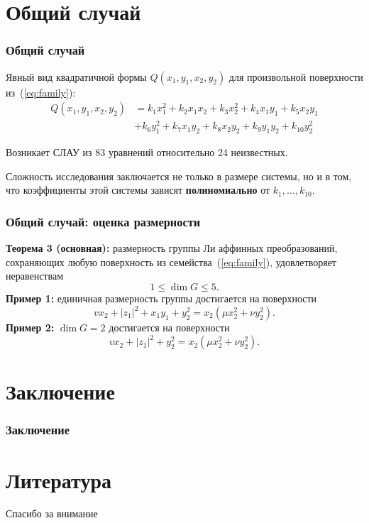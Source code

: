 \documentclass[russian,hyperref={unicode}]{beamer}
\begin{document}
\section{Общий случай}
\frame
{
	\frametitle{Общий случай}
	Явный вид квадратичной формы $Q(x_1, y_1, x_2, y_2)$ для произвольной поверхности из~(\ref{eq:family}): 
	\begin{align*}
	Q(x_1, y_1, x_2, y_2) &= k_1 x_1^2 + k_2 x_1 x_2 + k_3 x_2^2 + k_4 x_1 y_1 + k_5 x_2 y_1 \nonumber\\&+ k_6 y_1^2 + k_7 x_1 y_2 + k_8 x_2 y_2 + k_9 y_1 y_2 + k_{10} y_2^2
	\end{align*}
	
	Возникает СЛАУ из 83 уравнений относительно 24 неизвестных.
	
	Сложность исследования заключается не только в размере системы, но и в том, что 
	коэффициенты этой системы зависят \textbf{полиномиально} от $k_1, \dots, 
	k_{10}$.
}
\frame
{
	\frametitle{Общий случай: оценка размерности}
	\textbf{Теорема 3 (основная):}
	размерность группы Ли аффинных преобразований, сохраняющих 	любую поверхность 
	из семейства~(\ref{eq:family}), удовлетворяет неравенствам 
	$$
		1 \le \dim G \le 5.
	$$
	\textbf{Пример 1:}
	единичная размерность группы достигается на поверхности
	$$
		v x_2 + |z_1|^2 +x_1 y_1 + y_2^2 = x_2 (\mu x_2^2 + \nu y_2^2).
	$$ 
	\textbf{Пример 2:}
	$\dim G = 2$ достигается на поверхности
	$$
		v x_2 + |z_1|^2 + y_2^2 = x_2 (\mu x_2^2 + \nu y_2^2).
	$$ 
}
\section{Заключение}
\frame
{
	\frametitle{Заключение}
	
}
\section{Литература}
\frame
{
	\begin{center}
		\huge Спасибо за внимание
	\end{center}
}
\end{document}
